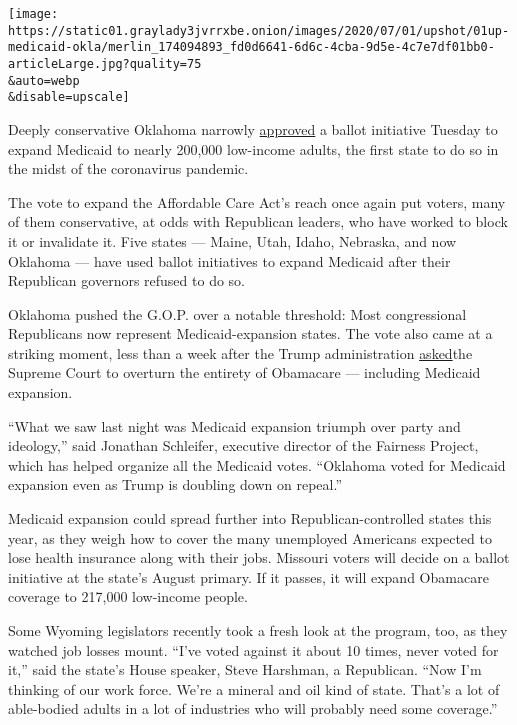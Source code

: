 \texttt{[image: https://static01.graylady3jvrrxbe.onion/images/2020/07/01/upshot/01up-medicaid-okla/merlin\_174094893\_fd0d6641-6d6c-4cba-9d5e-4c7e7df01bb0-articleLarge.jpg?quality=75\\\&auto=webp\\\&disable=upscale]}

Deeply conservative Oklahoma narrowly
\href{https://www.nytimes3xbfgragh.onion/interactive/2020/06/30/us/elections/results-oklahoma-primary-elections.html}{approved}
a ballot initiative Tuesday to expand Medicaid to nearly 200,000
low-income adults, the first state to do so in the midst of the
coronavirus pandemic.

The vote to expand the Affordable Care Act's reach once again put
voters, many of them conservative, at odds with Republican leaders, who
have worked to block it or invalidate it. Five states --- Maine, Utah,
Idaho, Nebraska, and now Oklahoma --- have used ballot initiatives to
expand Medicaid after their Republican governors refused to do so.

Oklahoma pushed the G.O.P. over a notable threshold: Most congressional
Republicans now represent Medicaid-expansion states. The vote also came
at a striking moment, less than a week after the Trump administration
\href{https://www.nytimes3xbfgragh.onion/2020/06/26/us/politics/obamacare-trump-administration-supreme-court.html}{asked}the
Supreme Court to overturn the entirety of Obamacare --- including
Medicaid expansion.

``What we saw last night was Medicaid expansion triumph over party and
ideology,'' said Jonathan Schleifer, executive director of the Fairness
Project, which has helped organize all the Medicaid votes. ``Oklahoma
voted for Medicaid expansion even as Trump is doubling down on repeal.''

Medicaid expansion could spread further into Republican-controlled
states this year, as they weigh how to cover the many unemployed
Americans expected to lose health insurance along with their jobs.
Missouri voters will decide on a ballot initiative at the state's August
primary. If it passes, it will expand Obamacare coverage to 217,000
low-income people.

Some Wyoming legislators recently took a fresh look at the program, too,
as they watched job losses mount. ``I've voted against it about 10
times, never voted for it,'' said the state's House speaker, Steve
Harshman, a Republican. ``Now I'm thinking of our work force. We're a
mineral and oil kind of state. That's a lot of able-bodied adults in a
lot of industries who will probably need some coverage.''

